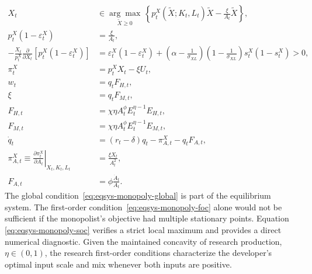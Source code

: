 \begin{subequations}
\label{eq:equilibrium-optimality-system}
\begin{align}
    X_t&\in
    \underset{\widetilde X\geq0}{\arg\max}\,
    \left\{
        p^X_t(\widetilde X;K_t,L_t)\widetilde X
        -\frac{\xi}{A_t}\widetilde X
    \right\},
    \label{eq:eqsys-monopoly-global}\\
    p^X_t(1-\varepsilon^X_t)&=\frac{\xi}{A_t},
    \label{eq:eqsys-monopoly-foc}\\
    -\frac{X_t}{p^X_t}
    \frac{\partial}{\partial X_t}
    \left[p^X_t(1-\varepsilon^X_t)\right]
    &=
    \varepsilon^X_t(1-\varepsilon^X_t)
    +\left(\alpha-\frac{1}{\sigma_{XL}}\right)
    \left(1-\frac{1}{\sigma_{XL}}\right)s^X_t(1-s^X_t)>0,
    \label{eq:eqsys-monopoly-soc}\\
    \pi^X_t&=p^X_tX_t-\xi U_t,
    \label{eq:eqsys-profit}\\
    w_t&=q_tF_{H,t},
    \label{eq:eqsys-human-research-foc}\\
    \xi&=q_tF_{M,t},
    \label{eq:eqsys-machine-research-foc}\\
    F_{H,t}&=\chi\eta A_t^\phi E_t^{\eta-1}E_{H,t},
    \label{eq:eqsys-human-research-product}\\
    F_{M,t}&=\chi\eta A_t^\phi E_t^{\eta-1}E_{M,t},
    \label{eq:eqsys-machine-research-product}\\
    \dot q_t&=(r_t-\delta)q_t-\pi^X_{A,t}-q_tF_{A,t},
    \label{eq:eqsys-costate}\\
    \pi^X_{A,t}
    \equiv
    \left.\frac{\partial\pi^X_t}{\partial A_t}\right|_{X_t,K_t,L_t}
    &=\frac{\xi X_t}{A_t^2},
    \label{eq:eqsys-profit-derivative}\\
    F_{A,t}&=\phi\frac{\dot A_t}{A_t}.
    \label{eq:eqsys-capability-derivatives}
\end{align}
\end{subequations}
The global condition~\eqref{eq:eqsys-monopoly-global} is part of the equilibrium
system. The first-order condition~\eqref{eq:eqsys-monopoly-foc} alone would not be
sufficient if the monopolist's objective had multiple stationary points. Equation
\eqref{eq:eqsys-monopoly-soc} verifies a strict local maximum and provides a direct
numerical diagnostic. Given the maintained concavity of research production,
$\eta\in(0,1)$, the research first-order conditions characterize the developer's
optimal input scale and mix whenever both inputs are positive.

